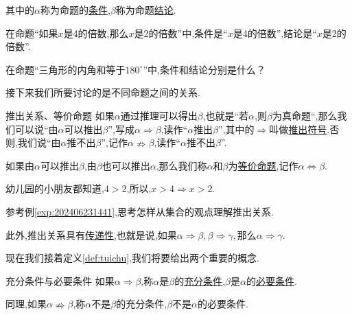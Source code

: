 \documentclass[lang=cn,math=cm,chinesefont=nofont,11pt,scheme=chinese,twocol]{elegantbook}
\begin{document}
其中的$\alpha$称为命题的\underline{条件},$\beta$称为命题\underline{结论}.

\begin{example}
  在命题“如果$x$是4的倍数,那么$x$是2的倍数”中,条件是“$x$是4的倍数”,结论是“$x$是2的倍数”.
\end{example}

\begin{exercise}
  在命题“三角形的内角和等于$180^{\circ}$”中,条件和结论分别是什么？
\end{exercise}

\hspace*{\fill}

接下来我们所要讨论的是不同命题之间的关系.

\begin{definition}{推出关系、等价命题}\label{def:tuichu}
  如果$\alpha$通过推理可以得出$\beta$,也就是“若$\alpha$,则$\beta$为真命题“,那么我们可以说“由$\alpha$可以推出$\beta$”,写成$\alpha\Rightarrow\beta$,读作“$\alpha$推出$\beta$”,其中的$\Rightarrow$叫做\underline{推出符号}.否则,我们说“由$\alpha$推不出$\beta$”,记作$\alpha\nRightarrow\beta$,读作“$\alpha$推不出$\beta$”.

  如果由$\alpha$可以推出$\beta$,由$\beta$也可以推出$\alpha$,那么我们称$\alpha$和$\beta$为\underline{等价命题},记作$\alpha\Leftrightarrow\beta$.
\end{definition}

\begin{example}\label{exp:202406231441}
  幼儿园的小朋友都知道,$4>2$,所以,$x>4\Rightarrow x>2$.
\end{example}

\begin{problem}\label{202406262000}
  参考例\ref{exp:202406231441},思考怎样从集合的观点理解推出关系.
\end{problem}

此外,推出关系具有\underline{传递性},也就是说,如果$\alpha\Rightarrow\beta,\beta\Rightarrow\gamma,$那么$\alpha\Rightarrow\gamma$.

\hspace*{\fill}

现在我们接着定义\ref{def:tuichu},我们将要给出两个重要的概念.

\begin{definition}{充分条件与必要条件}
  如果$\alpha\Rightarrow\beta$,称$\alpha$是$\beta$的\underline{充分条件},$\beta$是$\alpha$的\underline{必要条件}.

  同理,如果$\alpha\nRightarrow\beta$,称$\alpha$不是$\beta$的充分条件,$\beta$不是$\alpha$的必要条件.
\end{definition}
\end{document}
